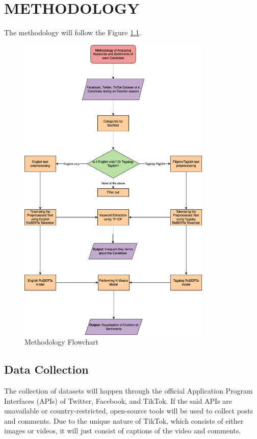 \chapter{METHODOLOGY}
The methodology will follow the Figure \ref{fig:Methodology}.

\begin{figure}[h!]
    \centering
    \includegraphics[width=0.82\textwidth]{Figures/methodology_flowchart.png}
    \caption{Methodology Flowchart}
    \label{fig:Methodology}
\end{figure}

\clearpage

\section{Data Collection}
The collection of datasets will happen through the official Application Program Interfaces (APIs) of Twitter, Facebook, and TikTok. If the said APIs are unavailable or country-restricted, open-source tools will be used to collect posts and comments. Due to the unique nature of TikTok, which consists of either images or videos, it will just consist of captions of the video and comments. 

